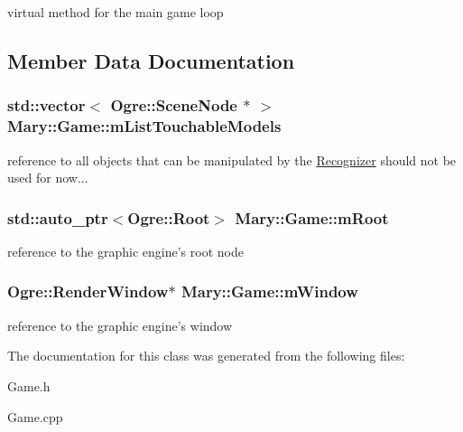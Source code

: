 virtual method for the main game loop 

\subsection{Member Data Documentation}
\hypertarget{class_mary_1_1_game_4a50e08c727d246290892e1c28d237e1}{
\subsubsection[mListTouchableModels]{\setlength{\rightskip}{0pt plus 5cm}std::vector$<$ Ogre::SceneNode $\ast$ $>$ {\bf Mary::Game::mListTouchableModels}}}
\label{class_mary_1_1_game_4a50e08c727d246290892e1c28d237e1}


reference to all objects that can be manipulated by the \hyperlink{class_mary_1_1_recognizer}{Recognizer} should not be used for now... \hypertarget{class_mary_1_1_game_eeca741315847788960bda451311d1fb}{
\subsubsection[mRoot]{\setlength{\rightskip}{0pt plus 5cm}std::auto\_\-ptr$<$Ogre::Root$>$ {\bf Mary::Game::mRoot}}}
\label{class_mary_1_1_game_eeca741315847788960bda451311d1fb}


reference to the graphic engine's root node \hypertarget{class_mary_1_1_game_5ac0225c8554738b304d2f855d9e0922}{
\subsubsection[mWindow]{\setlength{\rightskip}{0pt plus 5cm}Ogre::RenderWindow$\ast$ {\bf Mary::Game::mWindow}}}
\label{class_mary_1_1_game_5ac0225c8554738b304d2f855d9e0922}


reference to the graphic engine's window 

The documentation for this class was generated from the following files:\begin{CompactItemize}
\item 
Game.h\item 
Game.cpp\end{CompactItemize}
